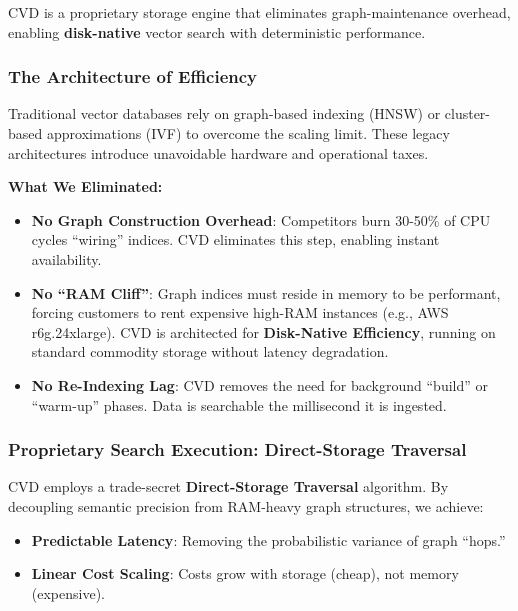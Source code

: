 CVD is a proprietary storage engine that eliminates graph-maintenance overhead, enabling \textbf{disk-native} vector search with deterministic performance.

\subsubsection{The Architecture of Efficiency}

Traditional vector databases rely on graph-based indexing (HNSW) or cluster-based approximations (IVF) to overcome the scaling limit. These legacy architectures introduce unavoidable hardware and operational taxes.

\textbf{What We Eliminated:}
\begin{itemize}
    \item \textbf{No Graph Construction Overhead}: Competitors burn 30-50\% of CPU cycles ``wiring'' indices. CVD eliminates this step, enabling instant availability.
    \item \textbf{No ``RAM Cliff''}: Graph indices must reside in memory to be performant, forcing customers to rent expensive high-RAM instances (e.g., AWS r6g.24xlarge). CVD is architected for \textbf{Disk-Native Efficiency}, running on standard commodity storage without latency degradation.
    \item \textbf{No Re-Indexing Lag}: CVD removes the need for background ``build'' or ``warm-up'' phases. Data is searchable the millisecond it is ingested.
\end{itemize}

\subsubsection{Proprietary Search Execution: Direct-Storage Traversal}

CVD employs a trade-secret \textbf{Direct-Storage Traversal} algorithm. By decoupling semantic precision from RAM-heavy graph structures, we achieve:

\begin{itemize}
    \item \textbf{Predictable Latency}: Removing the probabilistic variance of graph ``hops.''
    \item \textbf{Linear Cost Scaling}: Costs grow with storage (cheap), not memory (expensive).
\end{itemize}


